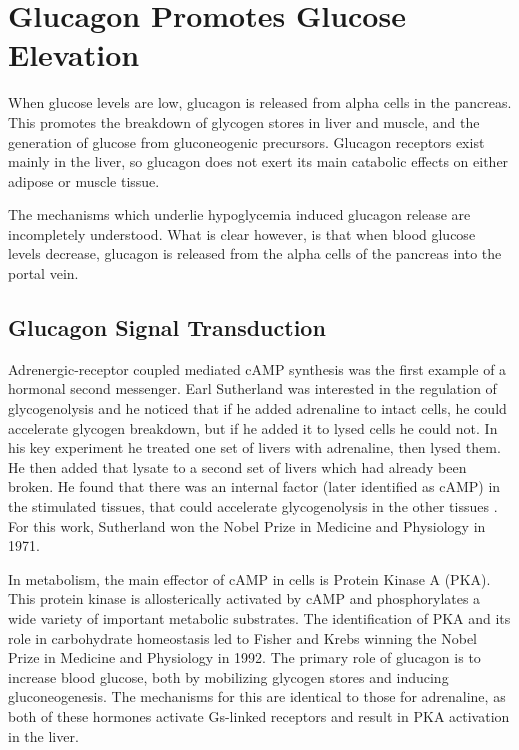 \documentclass{tufte-handout}
\begin{document}
\section{Glucagon Promotes Glucose Elevation}

 When glucose levels are low, glucagon is released from alpha cells in the pancreas.  This promotes the breakdown of glycogen stores in liver and muscle, and the generation of glucose from gluconeogenic precursors.  Glucagon receptors exist mainly in the liver, so glucagon does not exert its main catabolic effects on either adipose or muscle tissue. 

The mechanisms which underlie hypoglycemia induced glucagon release are incompletely understood.  What is clear however, is that when blood glucose levels decrease, glucagon is released from the alpha cells of the pancreas into the portal vein.

\subsection{Glucagon Signal Transduction}

Adrenergic-receptor coupled mediated cAMP synthesis was the first example of a hormonal second messenger.  Earl Sutherland was interested in the regulation of glycogenolysis and he noticed that if he added adrenaline to intact cells, he could accelerate glycogen breakdown, but if he added it to lysed cells he could not.  In his key experiment he treated one set of livers with adrenaline, then lysed them.  He then added that lysate to a second set of livers which had already been broken.  He found that there was an internal factor (later identified as cAMP) in the stimulated tissues, that could accelerate glycogenolysis in the other tissues \citep{Rall1956}.  For this work, Sutherland won the Nobel Prize in Medicine and Physiology in 1971.

In metabolism, the main effector of cAMP in cells is Protein Kinase A (PKA).  This protein kinase is allosterically activated by cAMP and phosphorylates a wide variety of important metabolic substrates.  The identification of PKA and its role in carbohydrate homeostasis led to Fisher and Krebs winning the Nobel Prize in Medicine and Physiology in 1992.  The primary role of glucagon is to increase blood glucose, both by mobilizing glycogen stores and inducing gluconeogenesis.  The mechanisms for this are identical to those for adrenaline, as both of these hormones activate Gs-linked receptors and result in PKA activation in the liver.
\end{document}
